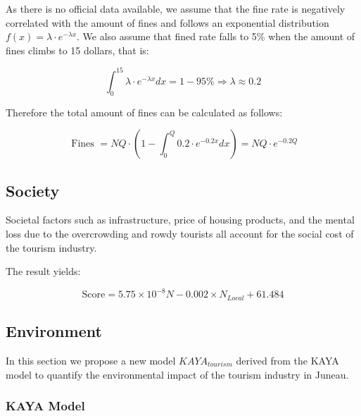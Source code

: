 As there is no official data available, we assume that the 
fine rate is negatively correlated with the amount of fines 
and follows an exponential distribution $f(x) = \lambda \cdot e^{-\lambda x}$. We also assume that 
fined rate falls to 5\% when the amount of fines climbs to 15 dollars, that is:

\begin{equation}
    \int_0^{15} \lambda \cdot e^{-\lambda x} d x=1-95 \% \Rightarrow \lambda \approx 0.2
\end{equation}

Therefore the total amount of fines can be calculated as follows:

\begin{equation}
    \text { Fines }=N Q \cdot\left(1-\int_0^Q 0.2 \cdot e^{-0.2 x} d x\right)=N Q \cdot e^{-0.2 Q}
\end{equation}



\subsection{Society}

Societal factors such as infrastructure, price of housing products, and the mental
loss due to the overcrowding and rowdy tourists all account for the social cost of the tourism industry.

The result yields:

\begin{equation}
    \text {Score}=5.75\times 10^{-8} N -0.002 \times N_{Local}+61.484
\end{equation}
\subsection{Environment}


In this section we propose a new model $KAYA_{tourism}$ derived 
from the KAYA model to quantify the environmental impact of the tourism industry in Juneau.

\subsubsection{KAYA Model}

